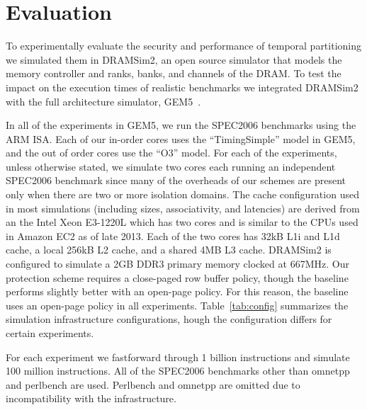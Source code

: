 \section{Evaluation}
\label{sec:eval}

To experimentally evaluate the security and performance of temporal 
partitioning we simulated them in DRAMSim2\cite{DRAMSim2}, an open source 
simulator that models the memory controller and ranks, banks, and channels of 
the DRAM. To test the impact on the execution times of realistic benchmarks we 
integrated DRAMSim2 with the full architecture simulator, GEM5~\cite{gem5}. 

In all of the experiments in GEM5, we run the SPEC2006 benchmarks using the
ARM ISA. Each of our in-order cores uses the ``TimingSimple'' model in GEM5, 
and the out of order cores use the ``O3'' model. For each of the experiments, 
unless otherwise stated, we simulate two cores each running an independent 
SPEC2006 benchmark since many of the overheads of our schemes are present only 
when there are two or more isolation domains. The cache configuration used in 
most simulations (including sizes, associativity, and latencies) are derived 
from an the Intel Xeon E3-1220L which has two cores and is similar to the CPUs 
used in Amazon EC2 as of late 2013. Each of the two cores has 32kB L1i and L1d 
cache, a local 256kB L2 cache, and a shared 4MB L3 cache. DRAMSim2 is 
configured to simulate a 2GB DDR3 primary memory clocked at 667MHz. 
Our protection scheme requires a close-paged row buffer policy, though the 
baseline performs slightly better with an open-page policy. For this reason, 
the baseline uses an open-page policy in all experiments. 
Table~\ref{tab:config} summarizes the simulation infrastructure configurations, 
hough the configuration differs for certain experiments. 

For each experiment we fastforward through 1 billion instructions and simulate 
100 million instructions. All of the SPEC2006 benchmarks other than omnetpp and 
perlbench are used. Perlbench and omnetpp are omitted due to incompatibility 
with the infrastructure.


